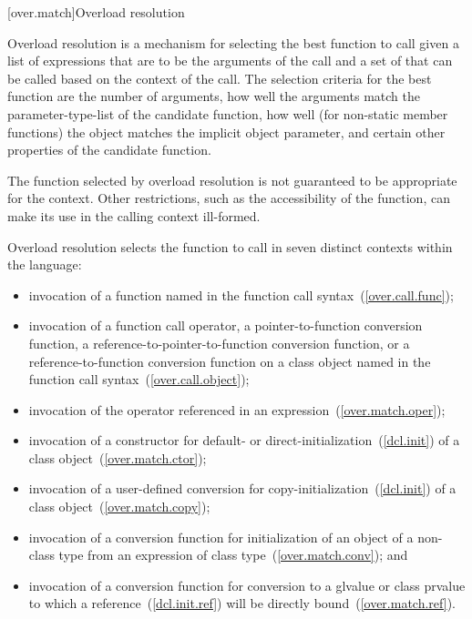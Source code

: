 [over.match]{Overload resolution}%
%
%

\pnum
Overload resolution is a mechanism for selecting the best
function to call given a list of expressions that are to be the
arguments of the call and a set of
that can
be called based on the context of the call.
The selection
criteria for the best function are the number of arguments, how
well the arguments match the parameter-type-list of the
candidate function,
how well (for non-static member functions) the object
matches the implicit object parameter,
and certain other properties of the candidate function.
\begin{note}
The function selected by overload resolution is not
guaranteed to be appropriate for the context.
Other restrictions,
such as the accessibility of the function, can make its use in
the calling context ill-formed.
\end{note}

\pnum
{}%
Overload resolution selects the function to call in seven distinct
contexts within the language:

\begin{itemize}
\item
invocation of a function named in the function call syntax~(\ref{over.call.func});
\item
invocation of a function call operator, a pointer-to-function
conversion function, a reference-to-pointer-to-function conversion
function, or a reference-to-function
conversion function on a class object named in the function
call syntax~(\ref{over.call.object});
\item
invocation of the operator referenced in an expression~(\ref{over.match.oper});
\item
invocation of a constructor for default- or direct-initialization~(\ref{dcl.init})
of a class object~(\ref{over.match.ctor});
\item
invocation of a user-defined conversion for
copy-initialization~(\ref{dcl.init}) of a class object~(\ref{over.match.copy});
\item
invocation of a conversion function for initialization of an object of a
non-class type from an expression of class type~(\ref{over.match.conv}); and
\item
invocation of a conversion function for conversion to a glvalue
or class prvalue
to which a reference~(\ref{dcl.init.ref})
will be directly bound~(\ref{over.match.ref}).
\end{itemize}

